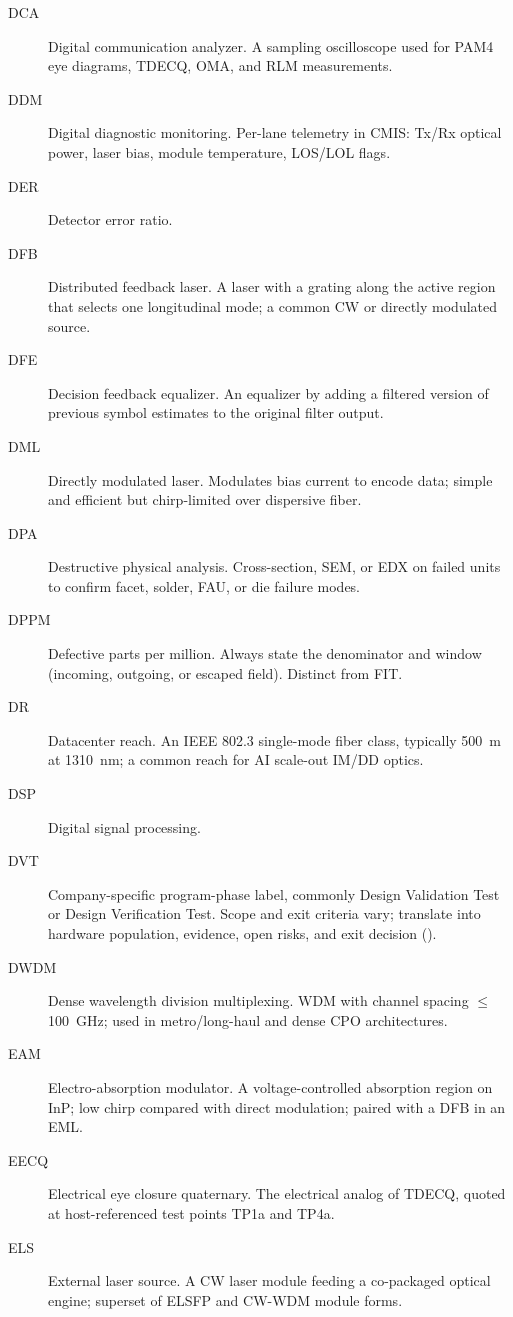 \begin{description}
\item[DCA] Digital communication analyzer. A sampling oscilloscope used for PAM4 eye diagrams, TDECQ, OMA, and RLM measurements.
\item[DDM] Digital diagnostic monitoring. Per-lane telemetry in CMIS: Tx/Rx optical power, laser bias, module temperature, LOS/LOL flags.
\item[DER] Detector error ratio.
\item[DFB] Distributed feedback laser. A laser with a grating along the active region that selects one longitudinal mode; a common CW or directly modulated source.
\item[DFE] Decision feedback equalizer. An equalizer by adding a filtered version of previous symbol estimates to the original filter output.
\item[DML] Directly modulated laser. Modulates bias current to encode data; simple and efficient but chirp-limited over dispersive fiber.
\item[DPA] Destructive physical analysis. Cross-section, SEM, or EDX on failed units to confirm facet, solder, FAU, or die failure modes.
\item[DPPM] Defective parts per million. Always state the denominator and window (incoming, outgoing, or escaped field). Distinct from FIT.
\item[DR] Datacenter reach. An IEEE 802.3 single-mode fiber class, typically 500~m at 1310~nm; a common reach for AI scale-out IM/DD optics.
\item[DSP] Digital signal processing.
\item[DVT] Company-specific program-phase label, commonly Design Validation Test or Design Verification Test. Scope and exit criteria vary; translate into hardware population, evidence, open risks, and exit decision ().
\item[DWDM] Dense wavelength division multiplexing. WDM with channel spacing $\le$100~GHz; used in metro/long-haul and dense CPO architectures.
\item[EAM] Electro-absorption modulator. A voltage-controlled absorption region on InP; low chirp compared with direct modulation; paired with a DFB in an EML.
\item[EECQ] Electrical eye closure quaternary. The electrical analog of TDECQ, quoted at host-referenced test points TP1a and TP4a.
\item[ELS] External laser source. A CW laser module feeding a co-packaged optical engine; superset of ELSFP and CW-WDM module forms.

\end{description}
